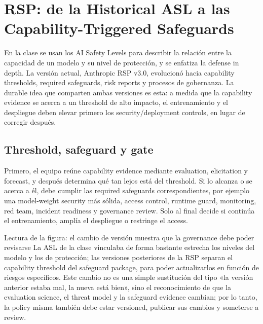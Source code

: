 \section{RSP: de la Historical ASL a las Capability-Triggered Safeguards}

En la clase se usan los AI Safety Levels para describir la relación entre la capacidad de un modelo y su nivel de protección, y se enfatiza la defense in depth. La versión actual, Anthropic RSP v3.0, evolucionó hacia capability thresholds, required safeguards, risk reports y procesos de gobernanza. La durable idea que comparten ambas versiones es esta: a medida que la capability evidence se acerca a un threshold de alto impacto, el entrenamiento y el despliegue deben elevar primero los security/deployment controls, en lugar de corregir después.

\subsection{Threshold, safeguard y gate}

Primero, el equipo reúne capability evidence mediante evaluation, elicitation y forecast, y después determina qué tan lejos está del threshold. Si lo alcanza o se acerca a él, debe cumplir las required safeguards correspondientes, por ejemplo una model-weight security más sólida, access control, runtime guard, monitoring, red team, incident readiness y governance review. Solo al final decide si continúa el entrenamiento, amplía el despliegue o restringe el access.


\begin{knowledgebox}{Lectura de la figura: el cambio de versión muestra que la governance debe poder revisarse}
La ASL de la clase vinculaba de forma bastante estrecha los niveles del modelo y los de protección; las versiones posteriores de la RSP separan el capability threshold del safeguard package, para poder actualizarlos en función de riesgos específicos. Este cambio no es una simple sustitución del tipo «la versión anterior estaba mal, la nueva está bien», sino el reconocimiento de que la evaluation science, el threat model y la safeguard evidence cambian; por lo tanto, la policy misma también debe estar versioned, publicar sus cambios y someterse a review.
\end{knowledgebox}

